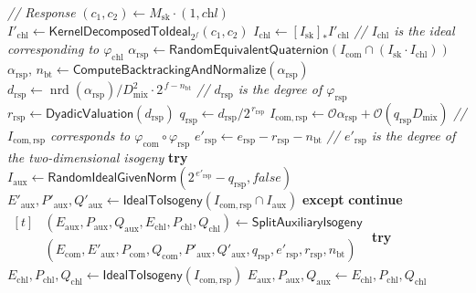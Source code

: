 \begin{algorithm}[!t]
\begin{algorithmic}[1]
  \Statex \hspace{\algorithmicindent}\textit{// Response}
  \State $(c_1,c_2) \gets M_{\mathrm{sk}}\cdot(1,\textit{chl})$
  \State $I'_{\mathrm{chl}} \gets \textsf{KernelDecomposedToIdeal}_{2^{f}}(c_1,c_2)$
  \State $I_{\mathrm{chl}} \gets [I_\text{sk}]_*I'_{\mathrm{chl}}$ \hfill \textit{// $I_{\mathrm{chl}}$ is the ideal corresponding to $\varphi_{\mathrm{chl}}$}
  \State $\alpha_{\mathrm{rsp}} \gets \textsf{RandomEquivalentQuaternion}(I_{\mathrm{com}}\cap (I_{\mathrm{sk}}\cdot I_{\mathrm{chl}}))$
  \State $\alpha_{\mathrm{rsp}},\, n_{\mathrm{bt}} \gets \textsf{ComputeBacktrackingAndNormalize}(\alpha_{\mathrm{rsp}})$
  \State $d_{\mathrm{rsp}} \gets \operatorname{nrd}(\alpha_{\mathrm{rsp}})/D_{\mathrm{mix}}^{2}\cdot 2^{\,f-n_{\mathrm{bt}}}$
          \hfill \textit{// $d_{\mathrm{rsp}}$ is the degree of $\varphi_{\mathrm{rsp}}$}
  \State $r_{\mathrm{rsp}} \gets \textsf{DyadicValuation}(d_{\mathrm{rsp}})$
  \State $q_{\mathrm{rsp}} \gets d_{\mathrm{rsp}}/2^{\,r_{\mathrm{rsp}}}$
  \State $I_{\mathrm{com,rsp}} \gets \mathcal{O}\alpha_{\mathrm{rsp}}+\mathcal{O}(q_{\mathrm{rsp}}D_{\mathrm{mix}})$
         \hfill \textit{// $I_{\mathrm{com,rsp}}$ corresponds to $\varphi_{\mathrm{com}}\circ\varphi_{\mathrm{rsp}}$}
  \State $e'_{\mathrm{rsp}} \gets e_{\mathrm{rsp}}-r_{\mathrm{rsp}}-n_{\mathrm{bt}}$
         \hfill \textit{// $e'_{\mathrm{rsp}}$ is the degree of the two-dimensional isogeny}
     \State \textbf{try}
     \State \quad $I_{\mathrm{aux}} \gets \textsf{RandomIdealGivenNorm}(2^{\,e'_{\mathrm{rsp}}}-q_{\mathrm{rsp}}, \textit{false})$
     \State \quad $E'_{\mathrm{aux}}, P'_{\mathrm{aux}}, Q'_{\mathrm{aux}}
                   \gets \textsf{IdealToIsogeny}(I_{\mathrm{com,rsp}} \cap I_{\mathrm{aux}})$
     \State \textbf{except}
     \State \quad \textbf{continue}
    \State $\begin{aligned}[t]
&(E_{\mathrm{aux}}, P_{\mathrm{aux}}, Q_{\mathrm{aux}}, E_{\mathrm{chl}}, P_{\mathrm{chl}}, Q_{\mathrm{chl}})
\gets {} \textsf{SplitAuxiliaryIsogeny}\\
&(E_{\mathrm{com}}, E'_{\mathrm{aux}}, P_{\mathrm{com}}, Q_{\mathrm{com}}, P'_{\mathrm{aux}}, Q'_{\mathrm{aux}}, q_{\mathrm{rsp}}, e'_{\mathrm{rsp}}, r_{\mathrm{rsp}}, n_{\mathrm{bt}})
\end{aligned}$
  \Else
     \State \textbf{try}
     \State \quad $E_{\mathrm{chl}}, P_{\mathrm{chl}}, Q_{\mathrm{chl}} \gets \textsf{IdealToIsogeny}(I_{\mathrm{com,rsp}})$
     \State \quad $E_\text{aux}, P_\text{aux}, Q_\text{aux} \gets E_\text{chl}, P_\text{chl}, Q_\text{chl}$

\end{algorithmic}
\end{algorithm}
